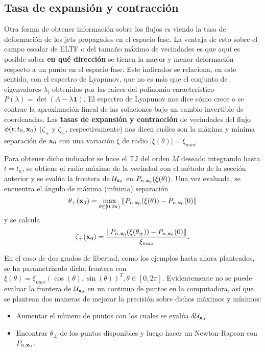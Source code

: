 
\subsection{Tasa de expansión y contracción}
\label{sec:contraccion_expansion}

Otra forma de obtener información sobre los flujos es viendo la tasa de deformación de los jets propagados en el espacio fase. La ventaja de esto sobre el campo escalar de ELTF o del tamaño máximo de vecindades es que aquí es posible saber \textbf{en qué dirección} se tienen la mayor y menor deformación respecto a un punto en el espacio fase. Este indicador se relaciona, en este sentido, con el espectro de Lyapunov, que no es más que el conjunto de eigenvalores $\lambda_i$ obtenidos por las raíces del polinomio característico $P(\lambda) = \det(A - \lambda\mathbf{1})$. El espectro de Lyapunov nos dice cómo crece o se contrae la aproximación lineal de las soluciones bajo un cambio invertible de coordenadas. Las \textbf{tasas de expansión y contracción} de vecindades del flujo $\phi(t;t_0,\mathbf{x}_0)$ ($\zeta_+$ y $\zeta_-$, respectivamente) nos dicen cuáles son la máxima y mínima separación de $\mathbf{x}_0$ con una variación $\xi$ de radio $|\xi(\theta)| = \xi_{max}$.

Para obtener dicho indicador se hace el TJ del orden $M$ deseado integrando hasta $t = t_n$, se obtiene el radio máximo de la vecindad con el método de la sección anterior y se evalúa la frontera de $\mathcal{U}_{\mathbf{x}_0}$ en $P_{n,\mathbf{x}_0}(\xi(\theta))$. Una vez evaluada, se encuentra el ángulo de máxima (mínima) separación 
\begin{equation}
 \theta_{+}(\mathbf{x}_0) = \max_{\theta \in [0,2\pi)} \left\lVert P_{n,\mathbf{x}_0}(\xi(\theta)) - P_{n,\mathbf{x}_0}(0) \right\rVert
\end{equation} 
y se calcula 
\begin{equation}
 \zeta_{\pm}(\mathbf{x}_0) = \frac{ \left\lVert P_{n,\mathbf{x}_0}(\xi(\theta_{\pm})) - P_{n,\mathbf{x}_0}(0)\right\rVert }{\xi_{max}}.
 \label{eq:max_min_rate}
\end{equation}

En el caso de dos grados de libertad, como los ejemplos hasta ahora planteados, se ha parametrizado dicha frontera con $\xi(\theta) = \xi_{max} \left( \cos(\theta), \sin(\theta) \right)^T, \theta \in [0,2\pi]$. Evidentemente no se puede evaluar la frontera de $\mathcal{U}_{\mathbf{x}_0}$ en un continuo de puntos en la computadora, así que se plantean dos maneras de mejorar la precisión sobre dichos máximos y mínimos: 
\begin{itemize}
\item Aumentar el número de puntos con los cuales se evalúa $\delta \mathcal{U}_{\mathbf{x}_0}$
\item Encontrar $\theta_{\pm}$ de los puntos disponibles y luego hacer un Newton-Rapson con $P_{n,\mathbf{x}_0}$. 
\end{itemize} 

